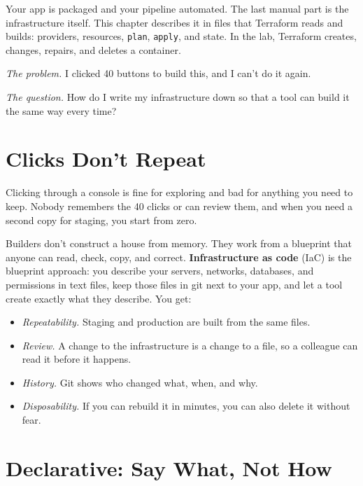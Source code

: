 
\begin{chapterintro}

Your app is packaged and your pipeline automated. The last manual part is the infrastructure itself. This chapter describes it in files that Terraform reads and builds: providers, resources, \texttt{plan}, \texttt{apply}, and state. In the lab, Terraform creates, changes, repairs, and deletes a container.

\end{chapterintro}

\emph{The problem.} I clicked 40 buttons to build this, and I can't do it again.

\emph{The question.} How do I write my infrastructure down so that a tool can build it the same way every time?

\section{Clicks Don't Repeat}\label{08-infrastructure-as-code:clicks-dont-repeat}

Clicking through a console is fine for exploring and bad for anything you need to keep. Nobody remembers the 40 clicks or can review them, and when you need a second copy for staging, you start from zero.

Builders don't construct a house from memory. They work from a blueprint that anyone can read, check, copy, and correct. \textbf{Infrastructure as code} (IaC) is the blueprint approach: you describe your servers, networks, databases, and permissions in text files, keep those files in git next to your app, and let a tool create exactly what they describe. You get:

\begin{itemize}
\tightlist
\item
  \emph{Repeatability.} Staging and production are built from the same files.
\item
  \emph{Review.} A change to the infrastructure is a change to a file, so a colleague can read it before it happens.
\item
  \emph{History.} Git shows who changed what, when, and why.
\item
  \emph{Disposability.} If you can rebuild it in minutes, you can also delete it without fear.
\end{itemize}

\section{Declarative: Say What, Not How}\label{08-infrastructure-as-code:declarative-say-what-not-how}

